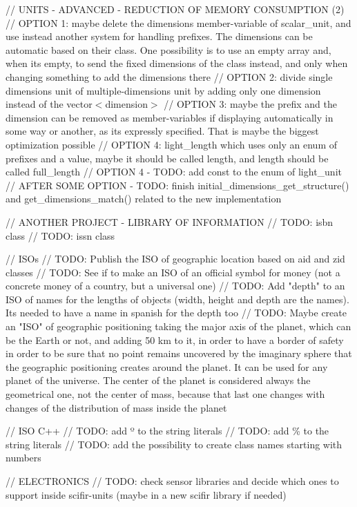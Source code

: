 // UNITS -\/ ADVANCED -\/ REDUCTION OF MEMORY CONSUMPTION (2) // OPTION 1\+: maybe delete the dimensions member-\/variable of scalar\+\_\+unit, and use instead another system for handling prefixes. The dimensions can be automatic based on their class. One possibility is to use an empty array and, when it\textquotesingle{}s empty, to send the fixed dimensions of the class instead, and only when changing something to add the dimensions there // OPTION 2\+: divide single dimensions unit of multiple-\/dimensions unit by adding only one dimension instead of the vector$<$dimension$>$ // OPTION 3\+: maybe the prefix and the dimension can be removed as member-\/variables if displaying automatically in some way or another, as it\textquotesingle{}s expressly specified. That is maybe the biggest optimization possible // OPTION 4\+: light\+\_\+length which uses only an enum of prefixes and a value, maybe it should be called length, and length should be called full\+\_\+length // OPTION 4 -\/ TODO\+: add const to the enum of light\+\_\+unit // AFTER SOME OPTION -\/ TODO\+: finish initial\+\_\+dimensions\+\_\+get\+\_\+structure() and get\+\_\+dimensions\+\_\+match() related to the new implementation

// ANOTHER PROJECT -\/ LIBRARY OF INFORMATION // TODO\+: isbn class // TODO\+: issn class

// ISOs // TODO\+: Publish the ISO of geographic location based on aid and zid classes // TODO\+: See if to make an ISO of an official symbol for money (not a concrete money of a country, but a universal one) // TODO\+: Add "{}depth"{} to an ISO of names for the lengths of objects (width, height and depth are the names). It\textquotesingle{}s needed to have a name in spanish for the depth too // TODO\+: Maybe create an "{}\+ISO"{} of geographic positioning taking the major axis of the planet, which can be the Earth or not, and adding 50 km to it, in order to have a border of safety in order to be sure that no point remains uncovered by the imaginary sphere that the geographic positioning creates around the planet. It can be used for any planet of the universe. The center of the planet is considered always the geometrical one, not the center of mass, because that last one changes with changes of the distribution of mass inside the planet

// ISO C++ // TODO\+: add º to the string literals // TODO\+: add \% to the string literals // TODO\+: add the possibility to create class names starting with numbers

// ELECTRONICS // TODO\+: check sensor libraries and decide which ones to support inside scifir-\/units (maybe in a new scifir library if needed)

